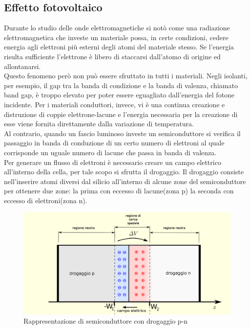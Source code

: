 \subsection{Effetto fotovoltaico}
Durante lo studio delle onde elettromagnetiche si notò come una radiazione elettromagnetica che investe un materiale possa, in certe condizioni, cedere energia agli elettroni più esterni degli atomi del materiale stesso. Se l'energia risulta sufficiente l'elettrone è libero di staccarsi dall'atomo di origine ed allontanarsi.\\
Questo fenomeno però non può essere sfruttato in tutti i materiali. Negli isolanti, per esempio, il gap tra la banda di condizione e la banda di valenza, chiamato band gap, è troppo elevato per poter essere eguagliato dall'energia del fotone incidente. Per i materiali conduttori, invece, vi è una continua creazione e distruzione di coppie elettrone-lacune e l'energia necessaria per la creazione di esse viene fornita direttamente dalla variazione di temperatura.\\
Al contrario, quando un fascio luminoso investe un semiconduttore si verifica il passaggio in banda di conduzione di un certo numero di elettroni al quale corrisponde un uguale numero di lacune che passa in banda di valenza.\\
Per generare un flusso di elettroni è necessario creare un campo elettrico all'interno della cella, per tale scopo si sfrutta il drogaggio. Il drogaggio consiste nell'inserire atomi diversi dal silicio all'interno di alcune zone del semiconduttore per ottenere due zone: la prima con eccesso di lacune(zona p) la seconda con eccesso di elettroni(zona n).\\
\begin{figure}[H]
    \centering
    \includegraphics[height=0.5\textwidth]{res/cap 3/drogaggio}
    \caption{Rappresentazione di semiconduttore con drogaggio p-n}
\end{figure}\noindent
